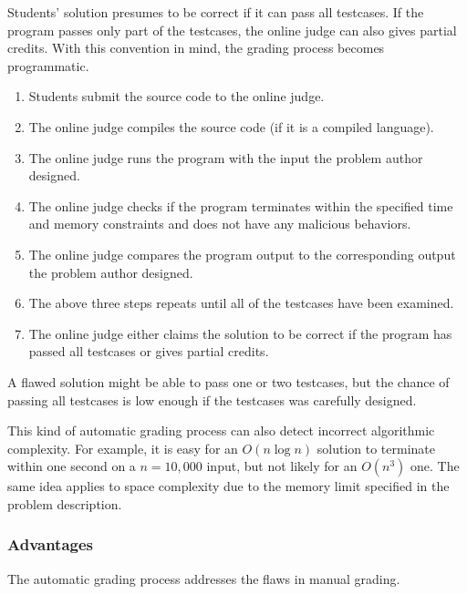             Students' solution presumes to be correct if it can pass all testcases.
            If the program passes only part of the testcases, the online judge can also gives partial credits.
            With this convention in mind, the grading process becomes programmatic.

            \begin{enumerate}
                \item Students submit the source code to the online judge.
                \item The online judge compiles the source code (if it is a compiled language).
                \item The online judge runs the program with the input the problem author designed.
                \item The online judge checks if the program terminates within the specified
                      time and memory constraints and does not have any malicious behaviors.
                \item The online judge compares the program output to the corresponding output
                      the problem author designed.
                \item The above three steps repeats until all of the testcases have been examined.
                \item The online judge either claims the solution to be correct if the program
                      has passed all testcases or gives partial credits.
            \end{enumerate}

            A flawed solution might be able to pass one or two testcases, but the chance of
            passing all testcases is low enough if the testcases was carefully designed.

            This kind of automatic grading process can also detect incorrect algorithmic complexity.
            For example, it is easy for an $O(n\log n)$ solution to terminate within one second
            on a $n=10,000$ input, but not likely for an $O(n^3)$ one.
            The same idea applies to space complexity due to the memory limit
            specified in the problem description.

        \subsubsection{Advantages}

            The automatic grading process addresses the flaws in manual grading.

